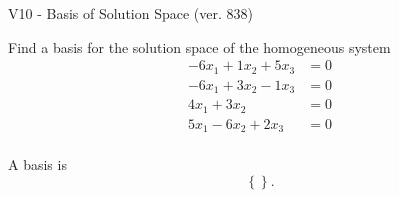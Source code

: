 \begin{exercise}
  \begin{exerciseTitle}V10 - Basis of Solution Space (ver. 838)\end{exerciseTitle}
  \begin{exerciseStatement}
    Find a basis for the solution space of the homogeneous system 
\begin{align*}
 -6 x_ 1 + 1 x_ 2 + 5 x_ 3 &= 0  \\ 
  -6 x_ 1 + 3 x_ 2 -1 x_ 3 &= 0  \\ 
  4 x_ 1 + 3 x_ 2 &= 0  \\ 
  5 x_ 1 -6 x_ 2 + 2 x_ 3 &= 0  \\ 
 \end{align*}


 
  \end{exerciseStatement}

  \begin{exerciseAnswer}
   A basis is   
\[\left\{\right\}.\]

  


  \end{exerciseAnswer}
\end{exercise}
